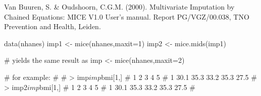 \documentclass{article}
\begin{document}
\begin{References}\relax
Van Buuren, S. \& Oudshoorn, C.G.M. (2000). Multivariate Imputation by Chained Equations: 
MICE V1.0 User's manual. Report PG/VGZ/00.038, TNO Prevention and Health, Leiden.
\end{References}
\begin{SeeAlso}\relax
\end{SeeAlso}
\begin{Examples}
\begin{ExampleCode}
data(nhanes)
imp1 <- mice(nhanes,maxit=1)
imp2 <- mice.mids(imp1)

# yields the same result as
imp <- mice(nhanes,maxit=2)

# for example:
# 
# > imp$imp$bmi[1,]
#      1    2    3    4    5 
# 1 30.1 35.3 33.2 35.3 27.5
# > imp2$imp$bmi[1,]
#      1    2    3    4    5 
# 1 30.1 35.3 33.2 35.3 27.5
# 
\end{ExampleCode}
\end{Examples}
\end{document}
